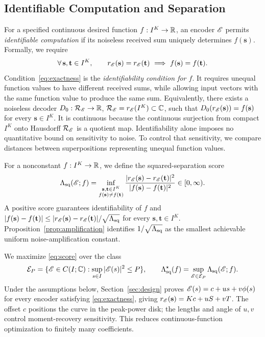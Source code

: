 \subsection{Identifiable Computation and Separation}
For a specified continuous desired function $f:I^K\to\mathbb R$, an encoder $\mathscr E$ permits \emph{identifiable computation} if its noiseless received sum uniquely determines $f(\mathbf s)$. Formally, we require
\begin{equation}
 \forall\,\mathbf s,\mathbf t\in I^K,\qquad
 r_\mathscr E(\mathbf s)=r_\mathscr E(\mathbf t)
 \ \Longrightarrow\ f(\mathbf s)=f(\mathbf t).
 \label{eq:exactness}
\end{equation}
Condition~\eqref{eq:exactness} is the \emph{identifiability condition for $f$}. It requires unequal function values to have different received sums, while allowing input vectors with the same function value to produce the same sum. Equivalently, there exists a noiseless decoder $D_0:\mathcal R_\mathscr E\to\mathbb R$, $\mathcal R_\mathscr E=r_\mathscr E(I^K)\subset\mathbb C$, such that $D_0(r_\mathscr E(\mathbf s))=f(\mathbf s)$ for every $\mathbf s\in I^K$. It is continuous because the continuous surjection from compact $I^K$ onto Hausdorff $\mathcal R_\mathscr E$ is a quotient map. Identifiability alone imposes no quantitative bound on sensitivity to noise. To control that sensitivity, we compare distances between superpositions representing unequal function values.

For a nonconstant $f:I^K\to\mathbb R$, we define the squared-separation score
\begin{equation}
 \Lambda_{\mathrm{sq}}(\mathscr E;f)
 =\inf_{\substack{\mathbf s,\mathbf t\in I^K\\f(\mathbf s)\ne f(\mathbf t)}}
 \frac{|r_\mathscr E(\mathbf s)-r_\mathscr E(\mathbf t)|^2}
 {|f(\mathbf s)-f(\mathbf t)|^2}\in[0,\infty).
 \label{eq:score}
\end{equation}
A positive score guarantees identifiability of $f$ and $|f(\mathbf s)-f(\mathbf t)|\le |r_\mathscr E(\mathbf s)-r_\mathscr E(\mathbf t)|/\sqrt{\Lambda_{\mathrm{sq}}}$ for every $\mathbf s,\mathbf t\in I^K$. Proposition~\ref{prop:amplification} identifies $1/\sqrt{\Lambda_{\mathrm{sq}}}$ as the smallest achievable uniform noise-amplification constant.

We maximize \eqref{eq:score} over the class
$$
 \mathcal E_P=\{\mathscr E\in C(I;\mathbb C):\sup_{s\in I}|\mathscr E(s)|^2\le P\},\qquad
 \Lambda_{\mathrm{sq}}^\star(f)=\sup_{\mathscr E\in\mathcal E_P}\Lambda_{\mathrm{sq}}(\mathscr E;f).
$$
Under the assumptions below, Section~\ref{sec:design} proves $\mathscr E(s)=c+us+v\phi(s)$ for every encoder satisfying \eqref{eq:exactness}, giving $r_\mathscr E(\mathbf s)=Kc+uS+vT$. The offset $c$ positions the curve in the peak-power disk; the lengths and angle of $u,v$ control moment-recovery sensitivity. This reduces continuous-function optimization to finitely many coefficients.
